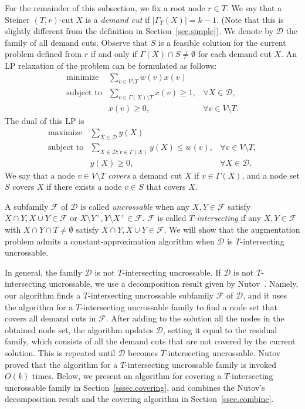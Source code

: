 \documentclass[11pt]{article}
\newcommand{\Ffam}{\mathcal{F}}
\newcommand{\Dfam}{\mathcal{D}}
\begin{document}
 For the remainder of this subsection, we fix a root node $r \in T$.
We say that a Steiner $(T,r)$-cut $X$ is a \emph{demand cut}
if $|\Gamma_T(X)|=k-1$.
 (Note that this is slightly different from the definition in
 Section~\ref{sec.simple}).
We denote by $\Dfam$ the family of all demand cuts.
 Observe that $S$ is a feasible solution for the current problem defined
 from $r$
 if and only if $\Gamma(X)\cap S\neq \emptyset$ for each demand cut $X$.
An LP relaxation of the problem can be formulated as follows:
\begin{equation}
 \label{eq.primal-lp}
 \begin{array}{lll}
  \text{minimize} & \sum_{v \in V \setminus T} w(v) x(v)\\
  \text{subject to} & \sum_{v \in \Gamma(X)\setminus T} x(v) \geq 1, 
   & \forall X \in \Dfam,\\
  &  x(v) \geq 0,  & \forall v \in V\setminus T.
 \end{array}
\end{equation}
The dual of this LP is 
\begin{equation}
 \label{eq.dual-lp}
 \begin{array}{lll}
  \text{maximize} & \sum_{X \in \Dfam} y(X)\\
  \text{subject to} & \sum_{X \in \Dfam: v \in \Gamma(X)} y(X) \leq w(v),
   & \forall v\in V \setminus T,\\
  &  y(X) \geq 0, &  \forall X \in \Dfam.
 \end{array}
\end{equation}
We say that
a node $v \in V \setminus T$ 
\emph{covers} a demand cut $X$
if $v \in \Gamma(X)$,
and a node set $S$
covers $X$ if there exists a node $v \in S$ that covers $X$.



A subfamily $\Ffam$ of $\Dfam$ is called \emph{uncrossable} when 
any $X,Y \in \Ffam$
satisfy $X \cap Y, X\cup Y \in \Ffam$ or
$X \setminus Y^+, Y \setminus X^+\in
\Ffam$.
$\Ffam$
is called \emph{$T$-intersecting}
 if
any $X,Y \in \Ffam$
with $X\cap Y \cap T \neq \emptyset$ satisfy $X \cap Y,X\cup Y \in
\Ffam$.
We will show that the augmentation problem admits  a
constant-approximation algorithm when $\Dfam$ is $T$-intersecting uncrossable.

In general, the family $\Dfam$ is not $T$-intersecting uncrossable.
If $\Dfam$ is not $T$-intersecting uncrossable, 
we use a decomposition result given by Nutov~\cite{Nutov12}.
Namely, our algorithm finds a $T$-intersecting uncrossable subfamily
$\Ffam$
of $\Dfam$,
and it uses the algorithm for a $T$-intersecting uncrossable family to find a node set that covers all demand cuts in $\Ffam$.
After adding to the solution all the nodes in the obtained node set,
the algorithm updates $\Dfam$, setting it equal to the residual family, which consists of all the demand
cuts that are not
covered by the current solution.
This is repeated until $\Dfam$ becomes $T$-intersecting uncrossable.
Nutov proved that the algorithm for a $T$-intersecting uncrossable family is invoked
$O(k)$ times.
Below,
we present an algorithm for
covering a $T$-intersecting uncrossable family in Section~\ref{sssec.covering}, and
combines the Nutov's decomposition result and the covering algorithm in Section~\ref{ssec.combine}.
\end{document}

